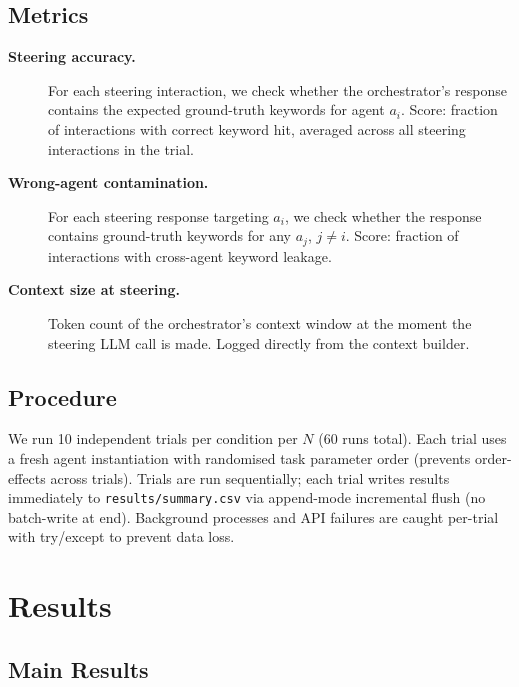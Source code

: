 \documentclass{article}
\begin{document}
\subsection{Metrics}
\label{sec:metrics}

\begin{description}
  \item[\textbf{Steering accuracy.}]
  For each steering interaction, we check whether the orchestrator's
  response contains the expected ground-truth keywords for agent $a_i$.
  Score: fraction of interactions with correct keyword hit, averaged
  across all steering interactions in the trial.

  \item[\textbf{Wrong-agent contamination.}]
  For each steering response targeting $a_i$, we check whether the
  response contains ground-truth keywords for any $a_j$, $j \neq i$.
  Score: fraction of interactions with cross-agent keyword leakage.

  \item[\textbf{Context size at steering.}]
  Token count of the orchestrator's context window at the moment the
  steering LLM call is made.
  Logged directly from the context builder.
\end{description}

\subsection{Procedure}
\label{sec:procedure}

We run 10 independent trials per condition per $N$ (60 runs total).
Each trial uses a fresh agent instantiation with randomised task
parameter order (prevents order-effects across trials).
Trials are run sequentially; each trial writes results immediately to
\texttt{results/summary.csv} via append-mode incremental flush (no
batch-write at end).
Background processes and API failures are caught per-trial with
try/except to prevent data loss.

\section{Results}
\label{sec:results}

\subsection{Main Results}
\end{document}
